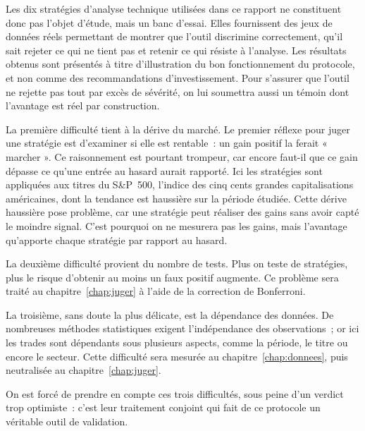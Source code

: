 Les dix stratégies d'analyse technique utilisées dans ce rapport ne
constituent donc pas l'objet d'étude, mais un banc d'essai. Elles
fournissent des jeux de données réels permettant de montrer que l'outil
discrimine correctement, qu'il sait rejeter ce qui ne tient pas et
retenir ce qui résiste à l'analyse. Les résultats obtenus sont présentés
à titre d'illustration du bon fonctionnement du protocole, et non comme
des recommandations d'investissement. Pour s'assurer que l'outil ne
rejette pas tout par excès de sévérité, on lui soumettra aussi un témoin
dont l'avantage est réel par construction.


La première difficulté tient à la dérive du marché. Le premier réflexe
pour juger une stratégie est d'examiner si elle est rentable~: un gain
positif la ferait « marcher ». Ce raisonnement est pourtant trompeur,
car encore faut-il que ce gain dépasse ce qu'une entrée au hasard aurait
rapporté. Ici les stratégies sont appliquées aux titres du S\&P~500,
l'indice des cinq cents grandes capitalisations américaines, dont la
tendance est haussière sur la période étudiée. Cette dérive haussière
pose problème, car une stratégie peut réaliser des gains sans avoir
capté le moindre signal. C'est pourquoi on ne mesurera pas les gains,
mais l'avantage qu'apporte chaque stratégie par rapport au hasard.

La deuxième difficulté provient du nombre de tests. Plus on teste de
stratégies, plus le risque d'obtenir au moins un faux positif augmente.
Ce problème sera traité au chapitre~\ref{chap:juger} à l'aide de la
correction de Bonferroni.

La troisième, sans doute la plus délicate, est la dépendance des
données. De nombreuses méthodes statistiques exigent l'indépendance des
observations~; or ici les trades sont dépendants sous plusieurs aspects,
comme la période, le titre ou encore le secteur. Cette difficulté sera
mesurée au chapitre~\ref{chap:donnees}, puis neutralisée au
chapitre~\ref{chap:juger}.

On est forcé de prendre en compte ces trois difficultés, sous peine d'un
verdict trop optimiste~: c'est leur traitement conjoint qui fait de ce
protocole un véritable outil de validation.



